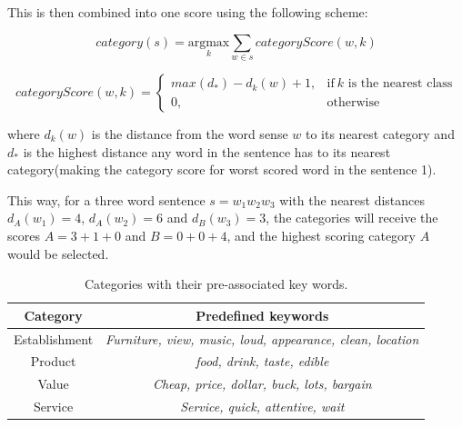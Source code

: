 \documentclass[a4paper,11pt]{kth-mag}
\begin{document}
This is then combined into one score using the following scheme:

\begin{equation} \label{eq:heruistic}
  category(s) =
  \underset{k}{\text{argmax}}
  \sum_{w \in s} categoryScore(w, k)
\end{equation}

\begin{equation} \label{eq:heruistic_d}
  categoryScore(w, k) =
  \begin{cases}
    max(d_*) - d_k(w) + 1, & \text{if}\ k \text{ is the nearest class}\\
    0, & \text{otherwise}
  \end{cases}
\end{equation}

where $d_k(w)$ is the distance from the word sense $w$
to its nearest category and $d_*$ is the highest distance any word in the sentence
has to its nearest category(making the category score for worst scored word in the sentence 1).

This way, for a three word sentence $s=w_1w_2w_3$ with the nearest distances
$d_A(w_1)=4$, $d_A(w_2)=6$ and $d_B(w_3)=3$,
the categories will receive the scores $A=3+1+0$ and $B=0+0+4$, and the highest scoring category $A$
would be selected.

\begin{table}[t]
  \centering
  \begin{tabular}{| c | c |}
    \hline
    \textbf{Category} & \textbf{Predefined keywords}\\ \hline
    Establishment & \emph{Furniture, view, music, loud, appearance, clean, location}\\ \hline
    Product & \emph{food, drink, taste, edible}\\ \hline
    Value & \emph{Cheap, price, dollar, buck, lots, bargain}\\ \hline
    Service & \emph{Service, quick, attentive, wait}\\ \hline
  \end{tabular}
  \caption{Categories with their pre-associated key words.}
  \label{tab:cat_words}
\end{table}
\end{document}
